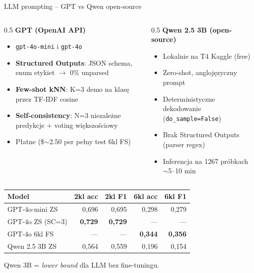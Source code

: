 \documentclass[10pt]{beamer}
\begin{document}
\begin{frame}{LLM prompting -- GPT vs Qwen open-source}
  \begin{columns}[T]
    \begin{column}{0.5\textwidth}
      \small
      \textbf{GPT (OpenAI API)}
      \begin{itemize}
        \item \texttt{gpt-4o-mini} i \texttt{gpt-4o}
        \item \textbf{Structured Outputs}: JSON schema, enum etykiet
              $\to$ 0\% unparsed
        \item \textbf{Few-shot kNN}: K=3 demo na klasę przez TF-IDF cosine
        \item \textbf{Self-consistency}: N=3 niezależne predykcje
              + voting większościowy
        \item Płatne (\$$\sim$2.50 per pełny test 6kl FS)
      \end{itemize}
    \end{column}
    \begin{column}{0.5\textwidth}
      \small
      \textbf{Qwen 2.5 3B (open-source)}
      \begin{itemize}
        \item Lokalnie na T4 Kaggle (free)
        \item Zero-shot, anglojęzyczny prompt
        \item Deterministyczne dekodowanie (\texttt{do\_sample=False})
        \item Brak Structured Outputs (parser regex)
        \item Inferencja na 1267 próbkach $\sim$5--10 min
      \end{itemize}
    \end{column}
  \end{columns}

  \vspace{0.5em}
  \small
  \begin{center}
  \begin{tabular}{lrrrr}
    \toprule
    Model & 2kl acc & 2kl F1 & 6kl acc & 6kl F1 \\
    \midrule
    GPT-4o-mini ZS    & 0{,}696 & 0{,}695 & 0{,}298 & 0{,}279 \\
    GPT-4o ZS (SC=3)  & \textbf{0{,}729} & \textbf{0{,}729} & --- & --- \\
    GPT-4o 6kl FS     & --- & --- & \textbf{0{,}344} & \textbf{0{,}356} \\
    Qwen 2.5 3B ZS    & 0{,}564 & 0{,}559 & 0{,}196 & 0{,}154 \\
    \bottomrule
  \end{tabular}
  \end{center}

  Qwen 3B = \emph{lower bound} dla LLM bez fine-tuningu.
\end{frame}
\end{document}
